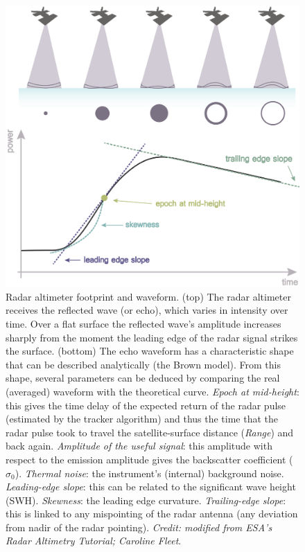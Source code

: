 \begin{figure}[!ht]
  \centering
  \includegraphics[width=.82\textwidth]{img/altimetry_footprint.png}
  \caption[Radar altimeter footprint and waveform]{
Radar altimeter footprint and waveform. (top) The radar altimeter receives the reflected wave (or echo), which varies in intensity over time. Over a flat surface the reflected wave's amplitude increases sharply from the moment the leading edge of the radar signal strikes the surface. (bottom) The echo waveform has a characteristic shape that can be described analytically (the Brown model). From this shape, several parameters can be deduced by comparing the real (averaged) waveform with the theoretical curve. \emph{Epoch at mid-height}: this gives the time delay of the expected return of the radar pulse (estimated by the tracker algorithm) and thus the time that the radar pulse took to travel the satellite-surface distance (\emph{Range}) and back again. \emph{Amplitude of the useful signal}: this amplitude with respect to the emission amplitude gives the backscatter coefficient ($\sigma_0$). \emph{Thermal noise}: the instrument's (internal) background noise. \emph{Leading-edge slope}: this can be related to the significant wave height (SWH). \emph{Skewness}: the leading edge curvature. \emph{Trailing-edge slope}: this is linked to any mispointing of the radar antenna (any deviation from nadir of the radar pointing). {\it Credit: modified from ESA's Radar Altimetry Tutorial; Caroline Fleet}.
  }
  \label{fig:ra-footprint-waveform}
\end{figure}


